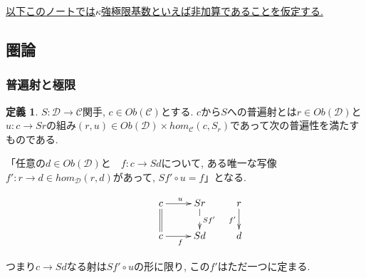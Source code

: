 \documentclass[dvipdfmx,a4paper,11pt]{article}
\theoremstyle{definition}
\newtheorem{dfn}[thm]{定義}
\begin{document}
 
\underline{ 以下このノートでは$\kappa$強極限基数といえば非加算であることを仮定する.}


\subsection{圏論}
\subsubsection{普遍射と極限}
 
 
 \begin{tcolorbox}
 [colback = white, colframe = green!35!black, fonttitle = \bfseries,breakable = true]
\begin{dfn}
$S : \mathcal{D} \to \mathcal{C}$関手, $c \in Ob(\mathcal{C})$とする.
$c$から$S$への普遍射とは$r \in Ob(\mathcal{D})$と $u: c \to Sr$の組み$(r,u) \in Ob(\mathcal{D})\times hom_{\mathcal{C}}(c, S_r)$であって次の普遍性を満たすものである.

「任意の$d \in Ob(\mathcal{D})$と　$f : c\to Sd$について, ある唯一な写像$f' : r \to d \in hom_{\mathcal{D}}(r,d)$があって, $Sf' \circ u =f$」となる.

\begin{equation*}
\xymatrix@C=25pt@R=20pt{
&c\ar@{=}[d]  \ar@{->}[r]^{u} & Sr\ar@{-->}[d]^{Sf'} &r\ar@{->}[d]_{f'}\\
&c\ar@{->}[r]_{f} &Sd&d \\   
}
\end{equation*}
\end{dfn}
つまり$c \to Sd$なる射は$Sf' \circ u$の形に限り, この$f'$はただ一つに定まる. 
 \end{tcolorbox}
\end{document}
